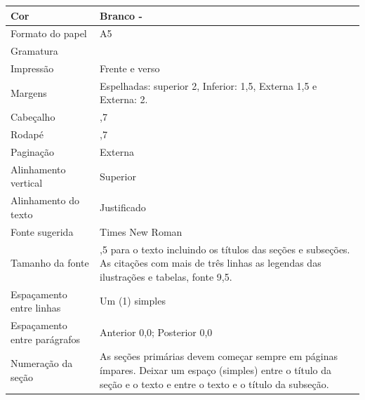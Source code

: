 \begin{tabularx}{\linewidth}{>{\RaggedRight}p{3cm}|>{\arraybackslash}X}
    Cor                          & Branco -                                                 \\ \hline
    Formato do papel             & A5                                                               \\ \hline
    Gramatura                    & 75                                                               \\ \hline
    Impressão                    & Frente e verso                                                   \\ \hline
    Margens                      & Espelhadas: superior 2, Inferior: 1,5, Externa 1,5 e Externa: 2. \\ \hline
    Cabeçalho                    & 0,7                                                              \\ \hline
    Rodapé                       & 0,7                                                              \\ \hline
    Paginação                    & Externa                                                          \\ \hline
    Alinhamento vertical         & Superior                                                         \\ \hline
    Alinhamento do texto         & Justificado                                                      \\ \hline
    Fonte sugerida               & Times New Roman                                                  \\ \hline
    Tamanho da fonte             & 10,5 para o texto incluindo os títulos das seções e subseções.
                                   As citações com mais de três linhas as legendas das ilustrações
                                   e tabelas, fonte 9,5.                                            \\ \hline
    Espaçamento entre linhas     & Um (1) simples                                                   \\ \hline
    Espaçamento entre parágrafos & Anterior 0,0; Posterior 0,0                                      \\ \hline
    Numeração da seção           & As seções  primárias devem  começar  sempre em páginas ímpares.
                                   Deixar um espaço (simples) entre o título da seção e o texto e
                                   entre o texto e o título da subseção.                            \\ \hline

\end{tabularx}











